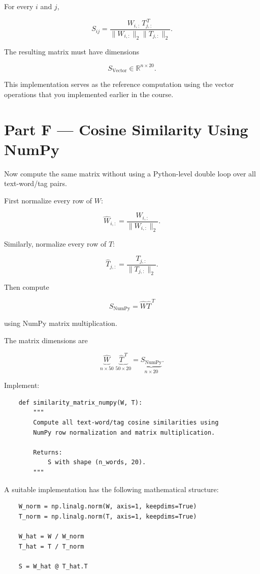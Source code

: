 \documentclass[12pt]{article}
\begin{document}
For every \(i\) and \(j\),

\[
S_{ij}
=
\frac{
W_{i,:}\,T_{j,:}^{\,T}
}{
\|W_{i,:}\|_2
\|T_{j,:}\|_2
}.
\]

The resulting matrix must have dimensions

\[
S_{\mathrm{Vector}}
\in
\mathbb{R}^{n\times20}.
\]

This implementation serves as the reference computation using the
vector operations that you implemented earlier in the course.

\section*{Part F --- Cosine Similarity Using NumPy}

Now compute the same matrix without using a Python-level double loop
over all text-word/tag pairs.

First normalize every row of \(W\):

\[
\widehat{W}_{i,:}
=
\frac{W_{i,:}}{\|W_{i,:}\|_2}.
\]

Similarly, normalize every row of \(T\):

\[
\widehat{T}_{j,:}
=
\frac{T_{j,:}}{\|T_{j,:}\|_2}.
\]

Then compute

\[
\boxed{
S_{\mathrm{NumPy}}
=
\widehat{W}\widehat{T}^{\,T}
}
\]

using NumPy matrix multiplication.

The matrix dimensions are

\[
\underbrace{
\widehat{W}
}_{n\times50}
\;
\underbrace{
\widehat{T}^{\,T}
}_{50\times20}
=
\underbrace{
S_{\mathrm{NumPy}}
}_{n\times20}.
\]

Implement:

\begin{lstlisting}
    def similarity_matrix_numpy(W, T):
        """
        Compute all text-word/tag cosine similarities using
        NumPy row normalization and matrix multiplication.

        Returns:
            S with shape (n_words, 20).
        """
\end{lstlisting}

A suitable implementation has the following mathematical structure:

\begin{lstlisting}
    W_norm = np.linalg.norm(W, axis=1, keepdims=True)
    T_norm = np.linalg.norm(T, axis=1, keepdims=True)

    W_hat = W / W_norm
    T_hat = T / T_norm

    S = W_hat @ T_hat.T
\end{lstlisting}
\end{document}
